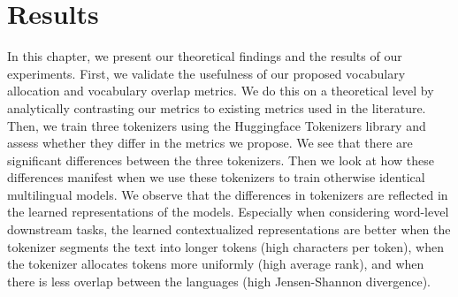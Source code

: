 \chapter{Results}



In this chapter, we present our theoretical findings and the results of our experiments. First, we validate the usefulness of our proposed vocabulary allocation and vocabulary overlap metrics. We do this on a theoretical level by analytically contrasting our metrics to existing metrics used in the literature. Then, we train three tokenizers using the Huggingface Tokenizers library and assess whether they differ in the metrics we propose. We see that there are significant differences between the three tokenizers. Then we look at how these differences manifest when we use these tokenizers to train otherwise identical multilingual models. We observe that the differences in tokenizers are reflected in the learned representations of the models. Especially when considering word-level downstream tasks, the learned contextualized representations are better when the tokenizer segments the text into longer tokens (high characters per token), when the tokenizer allocates tokens more uniformly (high average rank), and when there is less overlap between the languages (high Jensen-Shannon divergence).

